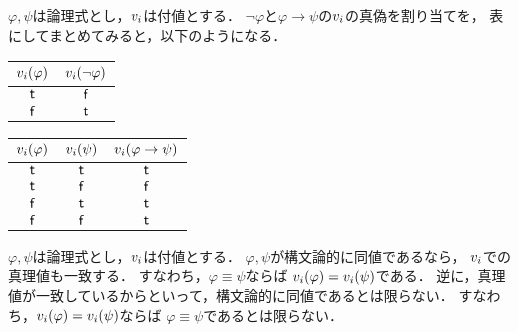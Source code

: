 \begin{myRemark}[真理値表]
  $\varphi, \psi$は論理式とし，$v_i$は付値とする．
  $\lnot \varphi$と$\varphi \to \psi$の$v_i$の真偽を割り当てを，
  表にしてまとめてみると，以下のようになる．
  \begin{table}
    \begin{tabular}{|c|c|}\hline
      $v_i(\varphi)$ & $v_i(\lnot\varphi)$ \\ \hline
      $\mathsf{t}$                                  & $\mathsf{f}$                                      \\ \hline
      $\mathsf{f}$                                 & $\mathsf{t}$                                       \\ \hline
    \end{tabular}
  \end{table}
  \begin{table}
    \begin{tabular}{|c|c|c|}\hline
      $v_i(\varphi)$ & $v_i(\psi)$ & $v_i(\varphi \to \psi)$ \\ \hline
      $\mathsf{t}$                                  & $\mathsf{t}$                               & $\mathsf{t}$                                             \\ \hline
      $\mathsf{t}$                                  & $\mathsf{f}$                              & $\mathsf{f}$                                            \\ \hline
      $\mathsf{f}$                                 & $\mathsf{t}$                               & $\mathsf{t}$                                             \\ \hline
      $\mathsf{f}$                                 & $\mathsf{f}$                              & $\mathsf{t}$                                             \\ \hline
    \end{tabular}
  \end{table}
\end{myRemark}

\begin{myRemark}[構文論的同値と真理値]
  \label{rmk:prop:syntax-equiv-truth}
  $\varphi, \psi$は論理式とし，$v_i$は付値とする．
  $\varphi,\psi$が構文論的に同値であるなら，
  $v_i$での真理値も一致する．
  すなわち，$\varphi \equiv \psi$ならば
  $v_i(\varphi) = v_i(\psi)$である．
  逆に，真理値が一致しているからといって，構文論的に同値であるとは限らない．
  すなわち，$v_i(\varphi) = v_i(\psi)$ならば
  $\varphi \equiv \psi$であるとは限らない．
\end{myRemark}

